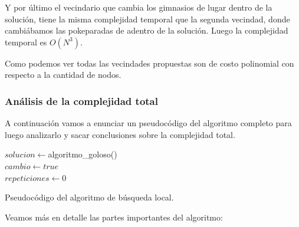 \begin{itemize}
Y por último el vecindario que cambia los gimnasios de lugar dentro de la solución, tiene la misma complejidad temporal que la segunda vecindad, donde cambiábamos las pokeparadas de adentro de la solución. Luego la complejidad temporal es $ O(N^3)$.

\end{itemize}

Como podemos ver todas las vecindades propuestas son de costo polinomial con respecto a la cantidad de nodos.

\subsubsection{Análisis de la complejidad total}

A continuación vamos a enunciar un pseudocódigo del algoritmo completo para luego analizarlo y sacar conclusiones sobre la complejidad total.

\begin{algorithm}[H]
  \label{algo: ej3_pseudocodigo}
  \BlankLine

  $solucion \gets $algoritmo\_goloso()\\
  $cambio \gets true$\\
  $repeticiones \gets 0$\\


  \BlankLine
  \caption{Pseudocódigo del algoritmo de búsqueda local.}
\end{algorithm}

\medskip

Veamos más en detalle las partes importantes del algoritmo:

